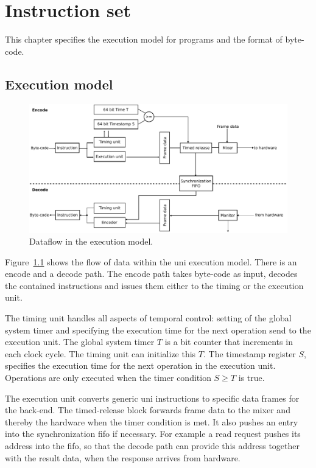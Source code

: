 \chapter{Instruction set}

This chapter specifies the execution model for programs and the format of byte-code.


\section{Execution model}
\begin{figure}
    \centering
    \includegraphics[width=\textwidth]{figures/dataflow.pdf}
    \caption{%
        Dataflow in the execution model.
    }
    \label{fig:dataflow}
\end{figure}

Figure~\ref{fig:dataflow} shows the flow of data within the \gls{uni} execution model.
There is an encode and a decode path.
The encode path takes byte-code as input, decodes the contained instructions and issues them either to the timing or the execution unit.

The timing unit handles all aspects of temporal control: setting of the global system timer and specifying the execution time for the next operation send to the execution unit.
The global system timer $T$ is a \unit[64]{bit} counter that increments in each clock cycle.
The timing unit can initialize this $T$.
The timestamp register $S$, specifies the execution time for the next operation in the execution unit.
Operations are only executed when the timer condition $S \ge T$ is true.

The execution unit converts generic \gls{uni} instructions to specific data frames for the back-end.
The timed-release block forwards frame data to the mixer and thereby the hardware when the timer condition is met.
It also pushes an entry into the synchronization \gls{fifo} if necessary.
For example a read request pushes its address into the \gls{fifo}, so that the decode path can provide this address together with the result data, when the response arrives from hardware.

